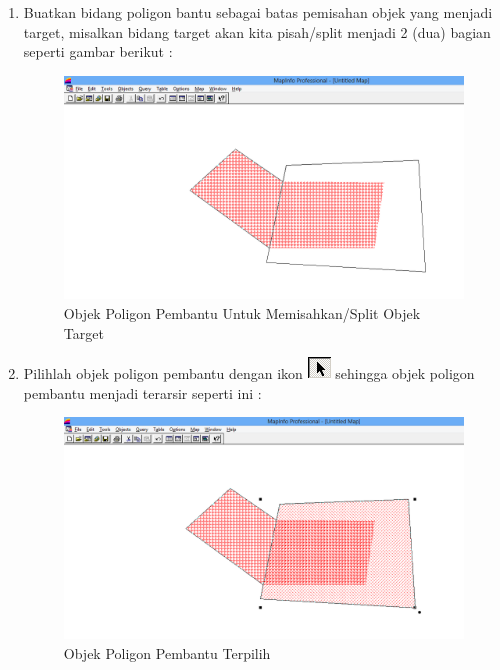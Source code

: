 \begin{enumerate}[\bfseries A.]
\begin{enumerate}[1.]
    \item Buatkan bidang poligon bantu sebagai batas pemisahan objek yang menjadi target, misalkan bidang target akan kita pisah/split menjadi 2 (dua) bagian seperti gambar berikut :
    
    \begin{figure}[H]
      \centering
      \includegraphics[width=1\textwidth]{./resources/020-poligon-pembantu-split}
      \caption{Objek Poligon Pembantu Untuk Memisahkan/Split Objek Target}
    \end{figure}
    
    \item Pilihlah objek poligon pembantu dengan ikon \includegraphics{./resources/008-ikon-select} sehingga objek poligon pembantu menjadi terarsir seperti ini :
    
    \begin{figure}[H]
      \centering
      \includegraphics[width=1\textwidth]{./resources/021-poligon-pembantu-terpilih-split}
      \caption{Objek Poligon Pembantu Terpilih}
    \end{figure}
    

\end{enumerate}
\end{enumerate}
